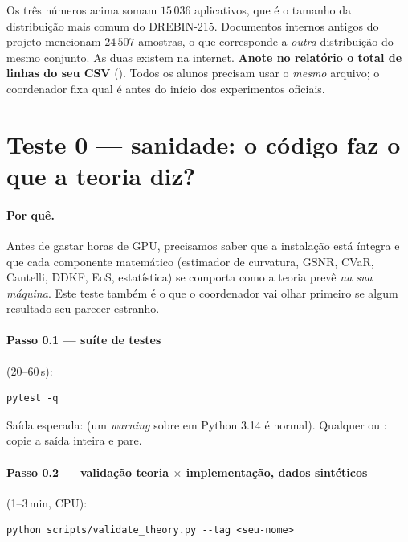 \begin{alerta}
Os três números acima somam $15\,036$ aplicativos, que é o tamanho da distribuição mais comum do DREBIN-215. Documentos internos antigos do projeto mencionam $24\,507$ amostras, o que corresponde a \emph{outra} distribuição do mesmo conjunto. As duas existem na internet. \textbf{Anote no relatório o total de linhas do seu CSV} (). Todos os alunos precisam usar o \emph{mesmo} arquivo; o coordenador fixa qual é antes do início dos experimentos oficiais.
\end{alerta}

\section{Teste 0 --- sanidade: o código faz o que a teoria diz?}\label{sec:t0}

\paragraph{Por quê.} Antes de gastar horas de GPU, precisamos saber que a instalação está íntegra e que cada componente matemático (estimador de curvatura, GSNR, CVaR, Cantelli, DDKF, EoS, estatística) se comporta como a teoria prevê \emph{na sua máquina}. Este teste também é o que o coordenador vai olhar primeiro se algum resultado seu parecer estranho.

\paragraph{Passo 0.1 --- suíte de testes} (20--60\,s):
\begin{lstlisting}
pytest -q
\end{lstlisting}
Saída esperada:  (um \emph{warning} sobre  em Python 3.14 é normal). Qualquer  ou : copie a saída inteira e pare.

\paragraph{Passo 0.2 --- validação teoria $\times$ implementação, dados sintéticos} (1--3\,min, CPU):
\begin{lstlisting}
python scripts/validate_theory.py --tag <seu-nome>
\end{lstlisting}
